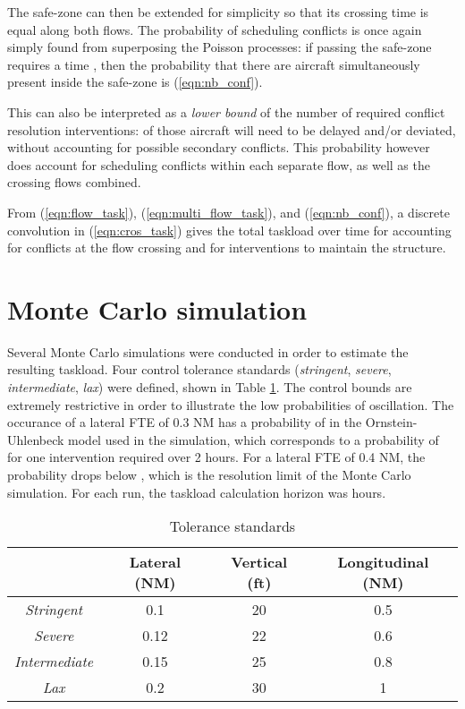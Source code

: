 \documentclass[conference]{IEEEtran}
\begin{document}
The safe-zone can then be extended for simplicity so that its crossing time is equal along both flows. The probability of scheduling conflicts is once again simply found from superposing the Poisson processes: if passing the safe-zone requires a time , then the probability that there are  aircraft simultaneously present inside the safe-zone is (\ref{eqn:nb_conf}).



This can also be interpreted as a \emph{lower bound} of the number of required conflict resolution interventions:  of those aircraft will need to be delayed and/or deviated, without accounting for possible secondary conflicts. This probability however does account for scheduling conflicts within each separate flow, as well as the crossing flows combined.

From (\ref{eqn:flow_task}), (\ref{eqn:multi_flow_task}), and (\ref{eqn:nb_conf}), a discrete convolution  in (\ref{eqn:cros_task}) gives the total taskload over time  for  accounting for  conflicts at the flow crossing and for  interventions to maintain the structure.




\section{Monte Carlo simulation}
\label{sec:sim}

Several Monte Carlo simulations were conducted in order to estimate the resulting taskload. Four control tolerance standards (\emph{stringent}, \emph{severe}, \emph{intermediate}, \emph{lax}) were defined, shown in Table \ref{tab:1flow_tol}. The control bounds are extremely restrictive in order to illustrate the low probabilities of oscillation. The occurance of a lateral FTE of 0.3 NM has a probability of  in the Ornstein-Uhlenbeck model used in the simulation, which corresponds to a probability of  for one intervention required over 2 hours. For a lateral FTE of 0.4 NM, the probability drops below , which is the resolution limit of the Monte Carlo simulation. For each run, the taskload calculation horizon was  hours.

\begin{table}
\caption{Tolerance standards}
\label{tab:1flow_tol}
\centering
\begin{tabular}{|c|c|c|c|}
\hline\hline 
 & Lateral (NM) & Vertical (ft) & Longitudinal (NM) \bigstrut \\ \hline\hline
\emph{Stringent} & 0.1 &  20 & 0.5 \bigstrut \\ \hline
\emph{Severe}& 0.12 & 22 & 0.6  \bigstrut \\ \hline
\emph{Intermediate}& 0.15 & 25 & 0.8 \bigstrut \\ \hline
\emph{Lax} & 0.2 & 30 & 1 \bigstrut\\ \hline \hline
\end{tabular}
\end{table}
\end{document}
